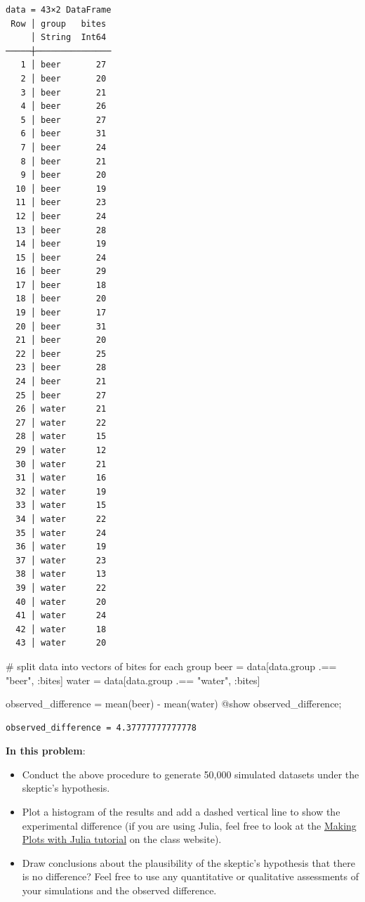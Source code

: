 \documentclass[
  letterpaper,
  DIV=11,
  numbers=noendperiod]{scrartcl}
\newenvironment{Shaded}{\begin{snugshade}}{\end{snugshade}}
\newcommand{\CommentTok}[1]{\textcolor[rgb]{0.37,0.37,0.37}{#1}}
\newcommand{\FunctionTok}[1]{\textcolor[rgb]{0.28,0.35,0.67}{#1}}
\newcommand{\NormalTok}[1]{\textcolor[rgb]{0.00,0.23,0.31}{#1}}
\newcommand{\OperatorTok}[1]{\textcolor[rgb]{0.37,0.37,0.37}{#1}}
\newcommand{\PreprocessorTok}[1]{\textcolor[rgb]{0.68,0.00,0.00}{#1}}
\newcommand{\StringTok}[1]{\textcolor[rgb]{0.13,0.47,0.30}{#1}}
\providecommand{\tightlist}{%
  \setlength{\itemsep}{0pt}\setlength{\parskip}{0pt}}\usepackage{longtable,booktabs,array}
\begin{document}
\begin{verbatim}
data = 43×2 DataFrame
 Row │ group   bites
     │ String  Int64
─────┼───────────────
   1 │ beer       27
   2 │ beer       20
   3 │ beer       21
   4 │ beer       26
   5 │ beer       27
   6 │ beer       31
   7 │ beer       24
   8 │ beer       21
   9 │ beer       20
  10 │ beer       19
  11 │ beer       23
  12 │ beer       24
  13 │ beer       28
  14 │ beer       19
  15 │ beer       24
  16 │ beer       29
  17 │ beer       18
  18 │ beer       20
  19 │ beer       17
  20 │ beer       31
  21 │ beer       20
  22 │ beer       25
  23 │ beer       28
  24 │ beer       21
  25 │ beer       27
  26 │ water      21
  27 │ water      22
  28 │ water      15
  29 │ water      12
  30 │ water      21
  31 │ water      16
  32 │ water      19
  33 │ water      15
  34 │ water      22
  35 │ water      24
  36 │ water      19
  37 │ water      23
  38 │ water      13
  39 │ water      22
  40 │ water      20
  41 │ water      24
  42 │ water      18
  43 │ water      20
\end{verbatim}

\begin{Shaded}
\begin{Highlighting}[]
\CommentTok{\# split data into vectors of bites for each group}
\NormalTok{beer }\OperatorTok{=}\NormalTok{ data[data.group }\OperatorTok{.==} \StringTok{"beer"}\NormalTok{, }\OperatorTok{:}\NormalTok{bites]}
\NormalTok{water }\OperatorTok{=}\NormalTok{ data[data.group }\OperatorTok{.==} \StringTok{"water"}\NormalTok{, }\OperatorTok{:}\NormalTok{bites]}

\NormalTok{observed\_difference }\OperatorTok{=} \FunctionTok{mean}\NormalTok{(beer) }\OperatorTok{{-}} \FunctionTok{mean}\NormalTok{(water)}
\PreprocessorTok{@show}\NormalTok{ observed\_difference;}
\end{Highlighting}
\end{Shaded}

\begin{verbatim}
observed_difference = 4.37777777777778
\end{verbatim}

\textbf{In this problem}:

\begin{itemize}
\tightlist
\item
  Conduct the above procedure to generate 50,000 simulated datasets
  under the skeptic's hypothesis.
\item
  Plot a histogram of the results and add a dashed vertical line to show
  the experimental difference (if you are using Julia, feel free to look
  at the
  \href{https://viveks.me/simulation-data-analysis/tutorials/julia-plots.html}{Making
  Plots with Julia tutorial} on the class website).
\item
  Draw conclusions about the plausibility of the skeptic's hypothesis
  that there is no difference? Feel free to use any quantitative or
  qualitative assessments of your simulations and the observed
  difference.
\end{itemize}
\end{document}
